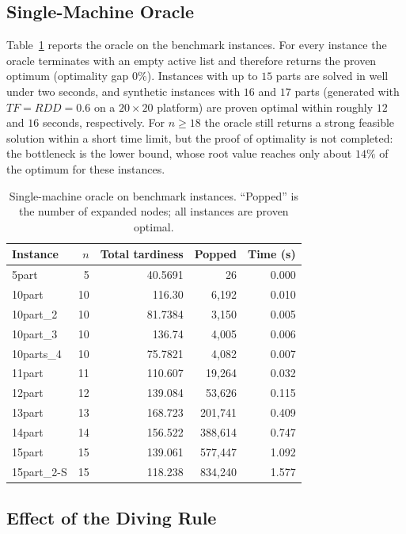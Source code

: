\documentclass[letterpaper, 10 pt, conference]{ieeeconf}  %
\begin{document}
\subsection{Single-Machine Oracle}
\label{subsec:res_single}

Table~\ref{tab:single} reports the oracle on the benchmark instances. For every
instance the oracle terminates with an empty active list and therefore returns
the proven optimum (optimality gap $0\%$). Instances with up to $15$ parts are
solved in well under two seconds, and synthetic instances with $16$ and $17$
parts (generated with $TF=RDD=0.6$ on a $20\times20$ platform) are proven
optimal within roughly $12$ and $16$ seconds, respectively. For $n\ge 18$ the
oracle still returns a strong feasible solution within a short time limit, but
the proof of optimality is not completed: the bottleneck is the lower bound,
whose root value reaches only about $14\%$ of the optimum for these instances.

\begin{table}[t]
\centering
\caption{Single-machine oracle on benchmark instances. ``Popped'' is the number
of expanded nodes; all instances are proven optimal.}
\label{tab:single}
\begin{tabular}{l r r r r}
\toprule
Instance & $n$ & Total tardiness & Popped & Time (s) \\
\midrule
5part      & 5  & 40.5691  & 26        & 0.000 \\
10part     & 10 & 116.30   & 6{,}192   & 0.010 \\
10part\_2  & 10 & 81.7384  & 3{,}150   & 0.005 \\
10part\_3  & 10 & 136.74   & 4{,}005   & 0.006 \\
10parts\_4 & 10 & 75.7821  & 4{,}082   & 0.007 \\
11part     & 11 & 110.607  & 19{,}264  & 0.032 \\
12part     & 12 & 139.084  & 53{,}626  & 0.115 \\
13part     & 13 & 168.723  & 201{,}741 & 0.409 \\
14part     & 14 & 156.522  & 388{,}614 & 0.747 \\
15part     & 15 & 139.061  & 577{,}447 & 1.092 \\
15part\_2-S& 15 & 118.238  & 834{,}240 & 1.577 \\
\bottomrule
\end{tabular}
\end{table}

\subsection{Effect of the Diving Rule}
\label{subsec:res_dive}
\end{document}
